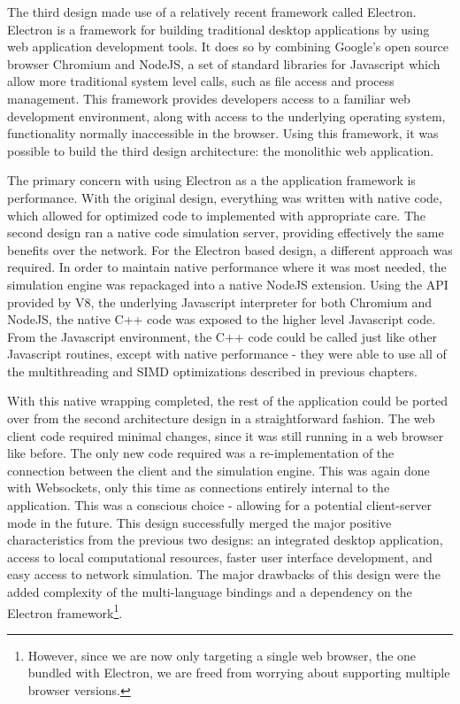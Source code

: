  The third design made use of a relatively recent framework called
 Electron. Electron is a framework for building traditional desktop
 applications by using web application development tools. It does so
 by combining Google's open source browser Chromium and NodeJS, a set
 of standard libraries for Javascript which allow more traditional
 system level calls, such as file access and process
 management. This framework provides developers access to a familiar
 web development environment, along with access to the underlying
 operating system, functionality normally inaccessible in the
 browser. Using this framework, it was possible to build the third
 design architecture: the monolithic web application.

 The primary concern with using Electron as a the application
 framework is performance. With the original design, everything was
 written with native code, which allowed for optimized code to
 implemented with appropriate care. The second design ran a native
 code simulation server, providing effectively the same benefits over
 the network. For the Electron based design, a different approach was
 required. In order to maintain native performance where it was most
 needed, the simulation engine was repackaged into a native NodeJS
 extension. Using the API provided by V8, the underlying Javascript
 interpreter for both Chromium and NodeJS, the native C++ code was
 exposed to the higher level Javascript code. From the Javascript
 environment, the C++ code could be called just like other Javascript
 routines, except with native performance - they were able to use all
 of the multithreading and SIMD optimizations described in previous
 chapters.

 With this native wrapping completed, the rest of the application
 could be ported over from the second architecture design in a
 straightforward fashion. The web client code required minimal
 changes, since it was still running in a web browser like before. The
 only new code required was a re-implementation of the connection
 between the client and the simulation engine. This was again done
 with Websockets, only this time as connections entirely internal to
 the application. This was a conscious choice - allowing for a
 potential client-server mode in the future. This design successfully
 merged the major positive characteristics from the previous two
 designs: an integrated desktop application, access to local
 computational resources, faster user interface development, and easy
 access to network simulation. The major drawbacks of this design were
 the added complexity of the multi-language bindings and a dependency
 on the Electron framework\footnote{However, since we are now only
   targeting a single web browser, the one bundled with Electron, we
   are freed from worrying about supporting multiple browser versions.}. 

 
